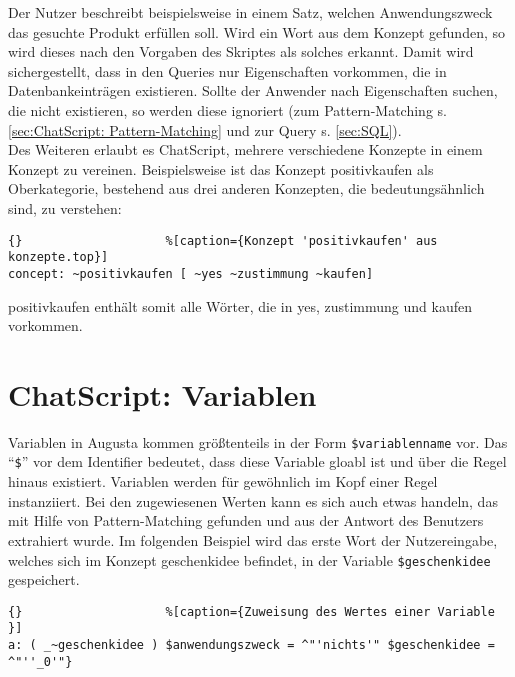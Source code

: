 Der Nutzer beschreibt beispielsweise in einem Satz, welchen Anwendungszweck das gesuchte Produkt erfüllen soll. Wird ein Wort aus dem Konzept gefunden, so wird dieses nach den Vorgaben des Skriptes als solches erkannt. Damit wird sichergestellt, dass in den Queries nur Eigenschaften vorkommen, die in Datenbankeinträgen existieren. Sollte der Anwender nach Eigenschaften suchen, die nicht existieren, so werden diese ignoriert (zum Pattern-Matching s. \ref{sec:ChatScript: Pattern-Matching} und zur Query s. \ref{sec:SQL}). \\

Des Weiteren erlaubt es ChatScript, mehrere verschiedene Konzepte in einem Konzept zu vereinen. Beispielsweise ist das Konzept \texttildelow positivkaufen als Oberkategorie, bestehend aus drei anderen Konzepten, die bedeutungsähnlich sind, zu verstehen:

\begin{lstlisting}{}					%[caption={Konzept 'positivkaufen' aus konzepte.top}]
concept: ~positivkaufen [ ~yes ~zustimmung ~kaufen]
\end{lstlisting}

\texttildelow positivkaufen enthält somit alle Wörter, die in \texttildelow yes, \texttildelow zustimmung und \texttildelow kaufen vorkommen.\\


\section{ChatScript: Variablen}
\label{sec:ChatScript: Variablen}
Variablen in Augusta kommen größtenteils in der Form \lstinline|$variablenname| vor. Das "`\lstinline|$|"' vor dem Identifier bedeutet, dass diese Variable gloabl ist und über die Regel hinaus existiert. Variablen werden für gewöhnlich im Kopf einer Regel instanziiert. Bei den zugewiesenen Werten kann es sich auch etwas handeln, das mit Hilfe von Pattern-Matching gefunden und aus der Antwort des Benutzers extrahiert wurde. Im folgenden Beispiel wird das erste Wort der Nutzereingabe, welches sich im Konzept \texttildelow geschenkidee befindet, in der Variable \lstinline|$geschenkidee| gespeichert. 

\begin{lstlisting}{}					%[caption={Zuweisung des Wertes einer Variable }]
a: ( _~geschenkidee ) $anwendungszweck = ^"'nichts'" $geschenkidee = ^"''_0'"}
\end{lstlisting}

